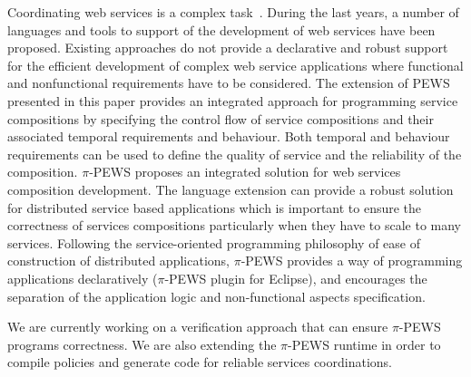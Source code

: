 \documentclass{sig-alternate}
\begin{document}
Coordinating web services is a complex task~\cite{MorseBPMTM04, KoutsoukosKANS06, pullen09, ChengGCM09}.
During the last years, a number of languages and tools to support of the development of web services have been proposed. 
Existing approaches do not provide a declarative and robust support for the efficient development of complex web service applications where functional and nonfunctional requirements have to be considered.
The extension of PEWS presented in this paper provides an integrated approach for programming service compositions by specifying the control flow of service compositions and their associated temporal requirements and behaviour. 
Both temporal and behaviour requirements can be used to define the quality of service and the reliability of the composition. 
$\pi$-PEWS proposes an integrated solution for web services composition development. 
The language extension can provide a  robust solution for distributed service based applications which is important to ensure the correctness of services compositions particularly when they have to scale to many services. 
Following the service-oriented programming philosophy of ease of construction of
distributed applications, $\pi$-PEWS provides a way of programming applications
declaratively ($\pi$-PEWS plugin for Eclipse), and encourages the separation of
the application logic and non-functional aspects specification.

We are currently working on a verification approach that can ensure $\pi$-PEWS programs correctness. 
We are also extending the $\pi$-PEWS runtime in order to compile policies and
generate code for reliable services coordinations. 

%   
  
% 
% 
%    


\end{document}
